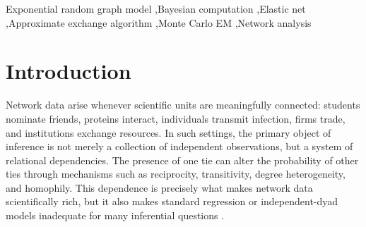 \documentclass[preprint,12pt,authoryear]{elsarticle}
\begin{document}
\begin{frontmatter}
\begin{abstract}
Exponential random graph models (ERGMs) describe dependence among network ties, but inference becomes difficult when the likelihood is intractable and candidate network statistics are strongly correlated. We introduce BERGM Elastic Net, an adaptive empirical-Bayes approach that combines lasso shrinkage with ridge stabilization in a Bayesian ERGM. A latent-variable formulation supports approximate exchange sampling, while empirical-Bayes updates adapt the amount of regularization to the observed network. We connect the proposed prior to elastic-net penalized likelihood and clarify the interpretation of thresholded reporting and coefficient grouping. The method is developed for over-specified network models containing many related structural and covariate effects.

\end{abstract}






\begin{keyword}






 Exponential random graph model \sep Bayesian computation \sep Elastic net \sep Approximate exchange algorithm \sep Monte Carlo EM \sep Network analysis
\end{keyword}


\end{frontmatter}






\section{Introduction}\label{sec:intro}
Network data arise whenever scientific units are meaningfully connected: students nominate friends, proteins interact, individuals transmit infection, firms trade, and institutions exchange resources. In such settings, the primary object of inference is not merely a collection of independent observations, but a system of relational dependencies. The presence of one tie can alter the probability of other ties through mechanisms such as reciprocity, transitivity, degree heterogeneity, and homophily. This dependence is precisely what makes network data scientifically rich, but it also makes standard regression or independent-dyad models inadequate for many inferential questions \citep{newman2003structure,zhang2019social}.
\end{document}
